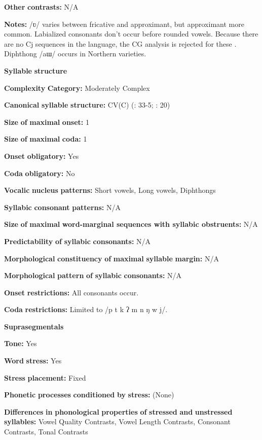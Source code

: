 \begin{styleBody}
\textbf{Other} \textbf{contrasts:} N/A

\textbf{Notes:} /ʋ/ varies between fricative and approximant, but approximant more common. Labialized consonants don’t occur before rounded vowels. Because there are no Cj sequences in the language, the CG analysis is rejected for these \citep[138]{Erickson2001}. Diphthong /aɯ/ occurs in Northern varieties.

\textbf{Syllable} \textbf{structure}

\textbf{Complexity} \textbf{Category:} Moderately Complex

\textbf{Canonical} \textbf{syllable} \textbf{structure:} CV(C) (\citealt{Enfield2007}: 33-5; \citealt{MorevEtAl1979}: 20)

\textbf{Size} \textbf{of} \textbf{maximal} \textbf{onset:} 1

\textbf{Size} \textbf{of} \textbf{maximal} \textbf{coda:} 1

\textbf{Onset} \textbf{obligatory:} Yes

\textbf{Coda} \textbf{obligatory:} No

\textbf{Vocalic} \textbf{nucleus} \textbf{patterns:} Short vowels, Long vowels, Diphthongs

\textbf{Syllabic} \textbf{consonant} \textbf{patterns:} N/A

\textbf{Size} \textbf{of} \textbf{maximal} \textbf{word{}-marginal sequences with syllabic obstruents:} N/A

\textbf{Predictability} \textbf{of} \textbf{syllabic} \textbf{consonants:} N/A

\textbf{Morphological} \textbf{constituency} \textbf{of} \textbf{maximal} \textbf{syllable} \textbf{margin:} N/A

\textbf{Morphological} \textbf{pattern} \textbf{of} \textbf{syllabic} \textbf{consonants:} N/A

\textbf{Onset} \textbf{restrictions:} All consonants occur. 

\textbf{Coda} \textbf{restrictions:} Limited to /p t k ʔ m n ŋ w j/.

\textbf{Suprasegmentals}

\textbf{Tone:} Yes

\textbf{Word} \textbf{stress:} Yes

\textbf{Stress} \textbf{placement:} Fixed

\textbf{Phonetic} \textbf{processes} \textbf{conditioned} \textbf{by} \textbf{stress:} (None)

\textbf{Differences} \textbf{in} \textbf{phonological} \textbf{properties} \textbf{of} \textbf{stressed} \textbf{and} \textbf{unstressed} \textbf{syllables:} Vowel Quality Contrasts, Vowel Length Contrasts, Consonant Contrasts, Tonal Contrasts


\end{styleBody}
